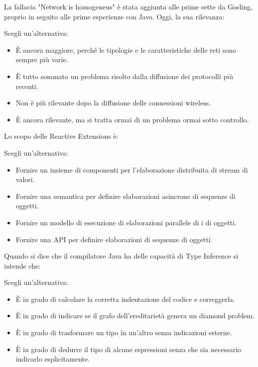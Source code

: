 \documentclass{article}
\begin{document}
La fallacia "Network is homogeneus" è stata aggiunta alle prime sette da Gosling, proprio in seguito alle prime esperienze con Java. Oggi, la sua rilevanza:

Scegli un'alternativa: 

\begin{itemize}
	\item È ancora maggiore, perché le tipologie e le caratteristiche delle reti 
		sono sempre più varie. \checkmark
	\item È tutto sommato un problema risolto dalla diffusione dei protocolli 
		più recenti.
	\item Non è più rilevante dopo la diffusione delle connessioni wireless.
	\item È ancora rilevante, ma si tratta ormai di un problema ormai sotto 
		controllo.
\end{itemize}

Lo scopo delle Reactive Extensions è:

Scegli un'alternativa: 

\begin{itemize}
	\item Fornire un insieme di componenti per l'elaborazione distribuita di stream di valori.
	\item Fornire una semantica per definire elaborazioni asincrone di sequenze di oggetti. \checkmark
	\item Fornire un modello di esecuzione di elaborazioni parallele di i di oggetti.
	\item Fornire una API per definire elaborazioni di sequenze di oggetti.
\end{itemize}


Quando si dice che il compilatore Java ha delle capacità di Type Inference si intende che:

Scegli un'alternativa: 

\begin{itemize}
\item È in grado di calcolare la corretta indentazione del codice e correggerla.
\item È in grado di indicare se il grafo dell'ereditarietà genera un diamond problem.
\item È in grado di trasformare un tipo în un'altro senza indicazioni esterne.
\item È in grado di dedurre il tipo di alcune espressioni senza che sia
	necessario indicarlo esplicitamente. \checkmark
\end{itemize}
\end{document}
